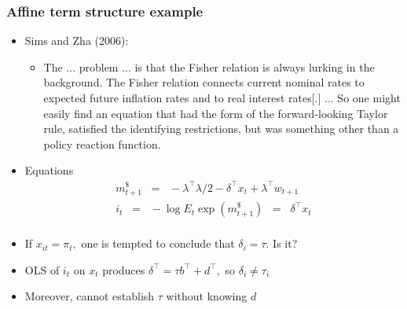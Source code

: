 \documentclass[handout]{beamer}
\begin{document}
\begin{frame}
\frametitle{Affine term structure example}

\begin{itemize} \itemsep=\bigskipamount
\item Sims and Zha (2006): \\

\medskip
\begin{itemize}
\item[]
\parbox[c]{0.85\textwidth}
{\it \raggedright
The ... problem ... is that the Fisher relation is always lurking in the background. The Fisher
relation connects current nominal rates to expected future inflation rates and to real interest
rates[.] ... So one might easily find an equation that had the form of the forward-looking
Taylor rule, satisfied the identifying restrictions, but was something other than a policy
reaction function.%
}
\end{itemize}
\pause
\item Equations %
\begin{align*}
     m^{\$}_{t+1} \;\;=\;\;  - \lambda^\top \lambda/2 - \delta^\top x_{t} + \lambda^\top w_{t+1}  \tag{Pricing kernel} \\
     i_t  \;\;=\;\; - \log E_t \exp(m^{\$}_{t+1})
        \;\;=\;\; \delta^\top x_t \tag{Euler equation} \\
\end{align*}
\item  If $x_{it}=\pi_t,$ one is tempted to conclude that $\delta_i=\tau.$ Is it?
  \item OLS of $i_t$ on $x_t$ produces $\delta^{\top}=\tau b^{\top} + d^{\top},$ so $\delta_i \ne \tau_i$
  \item Moreover,  cannot establish $\tau$ without knowing $d$
\end{itemize}

\end{frame}
\end{document}
